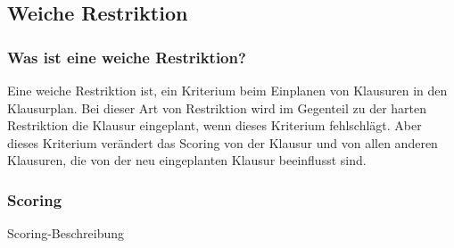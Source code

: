 \subsection{Weiche Restriktion}\label{subsec:weiche_restriktion}

\subsubsection{Was ist eine weiche Restriktion?}
Eine weiche Restriktion ist, ein Kriterium beim Einplanen von Klausuren in den Klausurplan.
Bei dieser Art von Restriktion wird im Gegenteil zu der harten Restriktion die Klausur eingeplant,
wenn dieses Kriterium fehlschlägt.
Aber dieses Kriterium verändert das Scoring von der Klausur und von allen anderen Klausuren, die von
der neu eingeplanten Klausur beeinflusst sind.

\subsubsection{Scoring}
Scoring-Beschreibung










